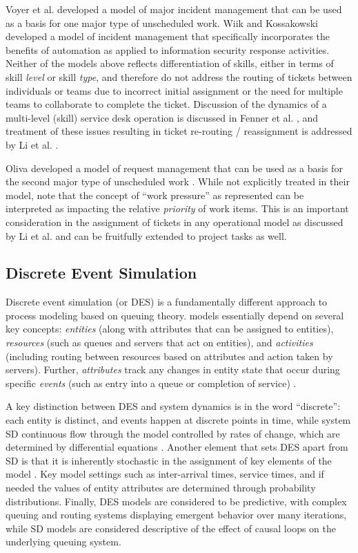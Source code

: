 \documentclass[conference]{IEEEtran}
\begin{document}
Voyer et al. \cite{voyer_system_2015} developed a model of major incident management that can be used as a basis for one major type of unscheduled work. Wiik and Kossakowski \cite{wiik_dynamics_2017} developed a model of incident management that specifically incorporates the benefits of automation as applied to information security response activities. Neither of the models above reflects differentiation of skills, either in terms of skill \textit{level} or skill \textit{type}, and therefore do not address the routing of tickets between individuals or teams due to incorrect initial assignment or the need for multiple teams to collaborate to complete the ticket. Discussion of the dynamics of a multi-level (skill) service desk operation is discussed in Fenner et al. \cite{fenner_system_2015}, and treatment of these issues resulting in ticket re-routing / reassignment is addressed by Li et al. \cite{li_measuring_2013}.

Oliva developed a model of request management that can be used as a basis for the second major type of unscheduled work \cite{oliva_dynamic_1996}. While not explicitly treated in their model, note that the concept of ``work pressure'' as represented can be interpreted as impacting the relative \textit{priority} of work items. This is an important consideration in the assignment of tickets in any operational model as discussed by Li et al. \cite{li_it_2010} and can be fruitfully extended to project tasks as well.

\subsection{Discrete Event Simulation}

Discrete event simulation (or DES) is a fundamentally different approach to process modeling based on queuing theory. models essentially depend on several key concepts: \textit{entities} (along with attributes that can be assigned to entities), \textit{resources} (such as queues and servers that act on entities), and \textit{activities} (including routing between resources based on attributes and action taken by servers). Further, \textit{attributes} track any changes in entity state that occur during specific \textit{events} (such as entry into a queue or completion of service) \cite{choi_modeling_2013}.

A key distinction between DES and system dynamics is in the word ``discrete'': each entity is distinct, and events happen at discrete points in time, while system SD continuous flow through the model controlled by rates of change, which are determined by differential equations \cite{brailsford_comparison_2001}. Another element that sets DES apart from SD is that it is inherently stochastic in the assignment of key elements of the model \cite{chahal_conceptual_2013}. Key model settings such as inter-arrival times, service times, and if needed the values of entity attributes are determined through probability distributions. Finally, DES models are considered to be predictive, with complex queuing and routing systems displaying emergent behavior over many iterations, while SD models are considered descriptive of the effect of causal loops on the underlying queuing system.
\end{document}

